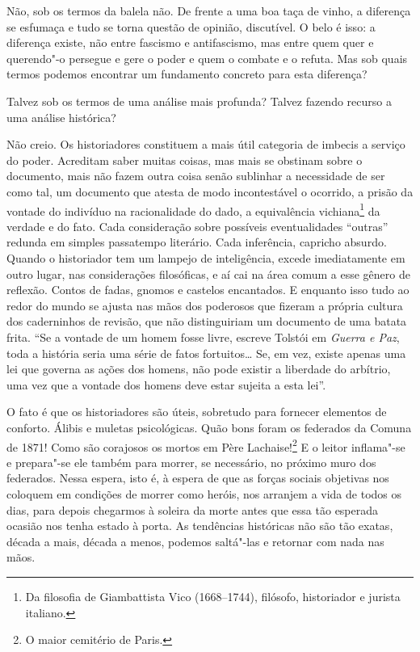 Não, sob os termos da balela não. De frente a uma boa taça de vinho, a
diferença se esfumaça e tudo se torna questão de opinião, discutível. O
belo é isso: a diferença existe, não entre fascismo e antifascismo, mas
entre quem quer e querendo"-o persegue e gere o poder e quem o combate e
o refuta. Mas sob quais termos podemos encontrar um fundamento concreto
para esta diferença?

Talvez sob os termos de uma análise mais profunda? Talvez fazendo
recurso a uma análise histórica?

Não creio. Os historiadores constituem a mais útil categoria de imbecis
a serviço do poder. Acreditam saber muitas coisas, mas mais se obstinam
sobre o documento, mais não fazem outra coisa senão sublinhar a
necessidade de ser como tal, um documento que atesta de modo
incontestável o ocorrido, a prisão da vontade do indivíduo na
racionalidade do dado, a equivalência vichiana\footnote{Da filosofia de Giambattista Vico (1668--1744), filósofo,
  historiador e jurista italiano.} da verdade e do fato. Cada consideração sobre possíveis
eventualidades ``outras'' redunda em simples passatempo literário. Cada
inferência, capricho absurdo. Quando o historiador tem um lampejo de
inteligência, excede imediatamente em outro lugar, nas considerações
filosóficas, e aí cai na área comum a esse gênero de reflexão. Contos de
fadas, gnomos e castelos encantados. E enquanto isso tudo ao redor do
mundo se ajusta nas mãos dos poderosos que fizeram a própria cultura dos
caderninhos de revisão, que não distinguiriam um documento de uma batata
frita. ``Se a vontade de um homem fosse livre, escreve Tolstói em
\emph{Guerra e Paz}, toda a história seria uma série de fatos
fortuitos\ldots{} Se, em vez, existe apenas uma lei que governa as ações
dos homens, não pode existir a liberdade do arbítrio, uma vez que a
vontade dos homens deve estar sujeita a esta lei''.

O fato é que os historiadores são úteis, sobretudo para fornecer
elementos de conforto. Álibis e muletas psicológicas. Quão bons foram os
federados da Comuna de 1871! Como são corajosos os mortos em Père
Lachaise!\footnote{O maior cemitério de Paris.} E o leitor inflama"-se e prepara"-se ele também para
morrer, se necessário, no próximo muro dos federados. Nessa espera, isto
é, à espera de que as forças sociais objetivas nos coloquem em condições
de morrer como heróis, nos arranjem a vida de todos os dias, para depois
chegarmos à soleira da morte antes que essa tão esperada ocasião nos
tenha estado à porta. As tendências históricas não são tão exatas,
década a mais, década a menos, podemos saltá"-las e retornar com nada nas
mãos.

